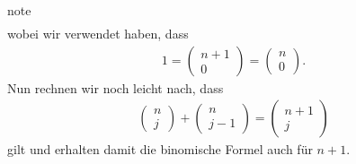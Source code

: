 \documentclass[letterpaper,10pt,english]{jupyterBook}
\begin{document}
\begin{sphinxadmonition}{note}
\begin{align*}
\end{align*}
wobei wir verwendet haben, dass
\begin{equation*}
\begin{split}1 =
\begin{pmatrix} n+1\\ 0 \end{pmatrix} 
= \begin{pmatrix} n\\ 0 \end{pmatrix}.\end{split}
\end{equation*}
Nun rechnen wir noch leicht nach, dass
\begin{equation*}
\begin{split}\begin{pmatrix} n\\j \end{pmatrix} +  \begin{pmatrix} n\\j-1 \end{pmatrix}
=
\begin{pmatrix} n+1\\j \end{pmatrix}\end{split}
\end{equation*}
gilt und erhalten damit die binomische Formel auch für \(n+1\).
\end{sphinxadmonition}
\end{document}
